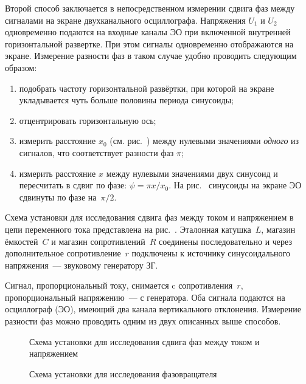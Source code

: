 Второй способ заключается в непосредственном измерении сдвига 
фаз между сигналами на экране двухканального осциллографа.
Напряжения $U_1$ и $U_2$ одновременно подаются на входные каналы ЭО
при включенной внутренней горизонтальной развертке. При этом
сигналы одновременно отображаются на экране.
Измерение разности фаз в таком случае удобно проводить следующим образом:
\begin{enumerate}[label=\arabic*),itemsep=0pt]
    \item подобрать частоту горизонтальной развёртки, при которой на экране 
    укладывается чуть больше половины периода синусоиды;
    \item отцентрировать горизонтальную ось;
    \item измерить расстояние $x_0$ (см. рис.~) между нулевыми значениями 
    \emph{одного} из сигналов, что соответствует разности фаз $\pi$;
    \item измерить расстояние $x$ между нулевыми значениями двух синусоид 
    и пересчитать в сдвиг по фазе: $\psi=\pi x/x_0$. На рис.~ 
    синусоиды на экране ЭО сдвинуты по фазе на~$\pi/2$.
\end{enumerate}

\experiment 
Схема установки для исследования сдвига фаз между током и напряжением 
в цепи переменного тока представлена на рис.~. Эталонная катушка~$L$, 
магазин ёмкостей~$C$ и магазин сопротивлений~$R$ соединены последовательно 
и через дополнительное сопротивление~$r$ подключены к источнику 
синусоидального напряжения~--- звуковому генератору ЗГ.

Сигнал, пропорциональный току, снимается c сопротивления~$r$, 
пропорциональный напряжению~--- с генератора. Оба сигнала подаются 
на осциллограф (ЭО), имеющий два канала вертикального 
отклонения. Измерение разности фаз можно проводить одним из двух
описанных выше способов.


\begin{figure}[h!]
    \centering
    \caption{Схема установки для исследования сдвига фаз между током и
        напряжением}
\end{figure}

\begin{figure}[h!]
    \centering
	\caption{Схема установки для исследования фазовращателя}
\end{figure}

